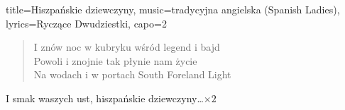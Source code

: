 \begin{song}{title={Hiszpańskie dziewczyny}, music={tradycyjna angielska (Spanish Ladies)}, lyrics={Ryczące Dwudziestki}, capo={2}}
\begin{verse}
        I znów noc w kubryku wśród legend i bajd \\
        Powoli i znojnie tak płynie nam życie \\
        Na wodach i w portach South Foreland Light\footnotemark{}
    \end{verse}
    \begin{chorus}
        I smak waszych ust, hiszpańskie dziewczyny\ldots $\times 2$
    \end{chorus}
\end{song}

